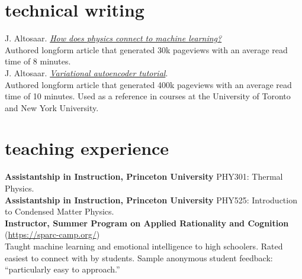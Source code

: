 \documentclass[4pt, letterpaper]{article}
\begin{document}
\section*{technical writing}
 J. Altosaar.
\href{https://jaan.io/how-does-physics-connect-machine-learning/}{\emph{How does
physics connect to machine learning?}} \\
Authored longform article that generated 30k pageviews with an average read time of 8 minutes. \\
 J. Altosaar.
\href{https://jaan.io/what-is-variational-autoencoder-vae-tutorial/}{
\emph{Variational autoencoder tutorial}}. \\
Authored longform article that generated 400k pageviews with an average read time of 10 minutes. Used as a reference in courses at the University of Toronto and New York University.

\section*{teaching experience}
\textbf{Assistantship in Instruction, Princeton University} PHY301: Thermal Physics.\\
\textbf{Assistantship in Instruction, Princeton University} PHY525: Introduction to Condensed Matter Physics.\\
\textbf{Instructor, Summer Program on Applied Rationality and
  Cognition} (\href{https://sparc-camp.org/}{https://sparc-camp.org/}) \\
Taught machine learning and emotional intelligence to high schoolers. Rated easiest to connect with by students. Sample anonymous student feedback: ``particularly easy to approach.''
\end{document}
